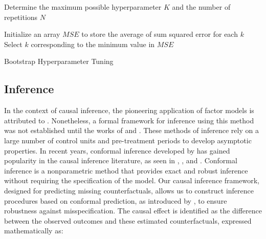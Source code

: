 \documentclass[12pt]{article}
\begin{document}
\begin{algorithm}[!ht]
    \SetAlgoLined
    Determine the maximum possible hyperparameter $K$ and the number of repetitions $N$\;

    Initialize an array $MSE$ to store the average of sum squared error for each $k$\;
    Select $k$ corresponding to the minimum value in $MSE$\;
    \caption{Bootstrap Hyperparameter Tuning}
    \label{algorithm: 1}
\end{algorithm}


\subsection{Inference}
\label{sec: inference}
In the context of causal inference, the pioneering application of factor models is attributed to \cite{hsiao2012panel}. Nonetheless, a formal framework for inference using this method was not established until the works of \cite{chan2016policy} and \cite{li2018inference}. These methods of inference rely on a large number of control units and pre-treatment periods to develop asymptotic properties. In recent years, conformal inference developed by \cite{chernozhukov2021exact} has gained popularity in the causal inference literature, as seen in \cite{ben2021augmented}, \cite{roth2023s}, and \cite{imbens2024causal}. Conformal inference is a nonparametric method that provides exact and robust inference without requiring the specification of the model. Our causal inference framework, designed for predicting missing counterfactuals, allows us to construct inference procedures based on conformal prediction, as introduced by \cite{shafer2008tutorial}, to ensure robustness against misspecification. The causal effect is identified as the difference between the observed outcomes and these estimated counterfactuals, expressed mathematically as:
\end{document}
